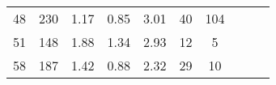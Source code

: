 \begin{tabular}{lccccccccc}
48 &      230 &                             1.17 &                             0.85 &                             3.01 &              40 &             104 \\
51 &      148 &                             1.88 &                             1.34 &                             2.93 &              12 &               5 \\
58 &      187 &                             1.42 &                             0.88 &                             2.32 &              29 &              10 \\
\bottomrule
\end{tabular}
